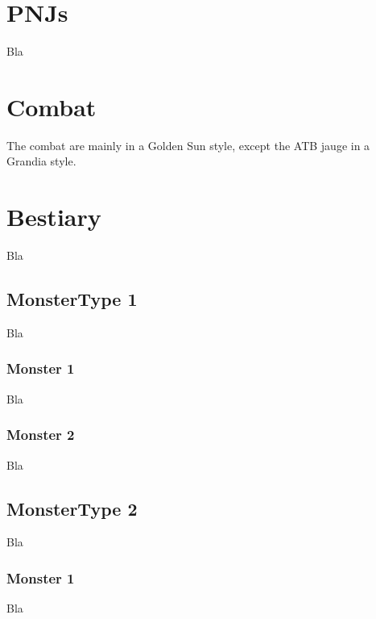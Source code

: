 \documentclass[a4paper,12pt]{book}
\begin{document}
\section{PNJs}
Bla
\section{Combat}
The combat are mainly in a Golden Sun style, except the ATB jauge in a Grandia style.
\section{Bestiary}
Bla
\subsection{MonsterType 1}
Bla
\subsubsection{Monster 1}
Bla
\subsubsection{Monster 2}
Bla
\subsection{MonsterType 2}
Bla
\subsubsection{Monster 1}
Bla
\end{document}
